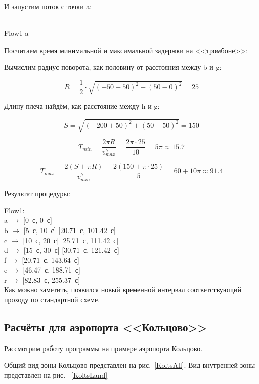 \documentclass[12pt]{article}
\theoremstyle{plain}
\begin{document}
И запустим поток с точки a:

\\
Flow1 a

Посчитаем время минимальной и максимальной задержки на <<тромбоне>>:

Вычислим радиус поворота, как половину от расстояния между b и g:

$$
 R = \frac{1}{2} \cdot \sqrt{(-50 + 50)^2 + (50 - 0)^2} = 25
$$

Длину плеча найдём, как расстояние между h и g:

$$
S = \sqrt{(-200 + 50)^2 + (50 - 50)^2} = 150
$$

$$
T_{min} = \frac{2 \pi R}{v_{max}^b} = \frac{2 \pi \cdot 25}{10} = 5\pi \approx 15.7
$$

$$
T_{max} = \frac{2(S + \pi R)}{v_{min}^b} = \frac{2(150 + \pi \cdot 25)}{5} = 60 + 10\pi \approx 91.4
$$

Результат процедуры:

\noindent Flow1:\\
a $\rightarrow$ [0~с, 0~с]\\
b $\rightarrow$ [5~с, 10~с] [20.71~с, 101.42~с]\\
c $\rightarrow$ [10~с, 20~с] [25.71~с, 111.42~с]\\
d $\rightarrow$ [15~с, 30~с] [30.71~с, 121.42~с]\\
f $\rightarrow$ [20.71~с, 143.64~с]\\
e $\rightarrow$ [46.47~с, 188.71~с]\\
r $\rightarrow$ [82.83~с, 255.37~с]\\


Как можно заметить, появился новый временной интервал соответствующий проходу по стандартной схеме.

\newpage



\subsection{Расчёты для аэропорта <<Кольцово>>}

Рассмотрим работу программы на примере аэропорта Кольцово.

Общий вид зоны Кольцово представлен на рис.~\ref{KoltsAll}. Вид внутренней зоны представлен на рис.~ \ref{KoltsLand}
\end{document}
